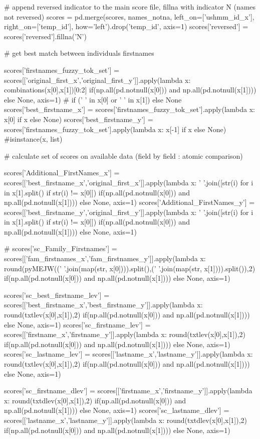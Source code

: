 \documentclass[a4paper,12pt,twoside]{book}
\begin{document}
\begin{python}
  # append reversed indicator to the main score file, fillna with indicator N (names not reversed)
  scores = pd.merge(scores, names_notna, left_on=['ushmm_id_x'], right_on=['temp_id'], how='left').drop('temp_id', axis=1)
  scores['reversed'] = scores['reversed'].fillna('N')
   
  # get best match between individuals firstnames

  scores['firstnames_fuzzy_tok_set'] = scores[['original_first_x','original_first_y']].apply(lambda x: combinations(x[0],x[1])[0:2] if(np.all(pd.notnull(x[0])) and np.all(pd.notnull(x[1]))) else None, axis=1) # if (' ' in x[0] or ' ' in x[1]) else None
  scores['best_firstname_x'] = scores['firstnames_fuzzy_tok_set'].apply(lambda x: x[0] if x else None)
  scores['best_firstname_y'] = scores['firstnames_fuzzy_tok_set'].apply(lambda x: x[-1] if x else None) #isinstance(x, list)
  
  # calculate set of scores on available data (field by field : atomic comparison)

  scores['Additional_FirstNames_x'] = scores[['best_firstname_x','original_first_x']].apply(lambda x: ' '.join([str(i) for i in x[1].split() if str(i) != x[0]]) if(np.all(pd.notnull(x[0])) and np.all(pd.notnull(x[1]))) else None, axis=1)
  scores['Additional_FirstNames_y'] = scores[['best_firstname_y','original_first_y']].apply(lambda x: ' '.join([str(i) for i in x[1].split() if str(i) != x[0]]) if(np.all(pd.notnull(x[0])) and np.all(pd.notnull(x[1]))) else None, axis=1)

  # scores['sc_Family_Firstnames'] = scores[['fam_firstnames_x','fam_firstnames_y']].apply(lambda x: round(pyMEJW((' '.join(map(str, x[0]))).split(),(' '.join(map(str, x[1]))).split()),2) if(np.all(pd.notnull(x[0])) and np.all(pd.notnull(x[1]))) else None, axis=1)

  scores['sc_best_firstname_lev'] = scores[['best_firstname_x','best_firstname_y']].apply(lambda x: round(txtlev(x[0],x[1]),2) if(np.all(pd.notnull(x[0])) and np.all(pd.notnull(x[1]))) else None, axis=1)
  scores['sc_firstname_lev'] = scores[['firstname_x','firstname_y']].apply(lambda x: round(txtlev(x[0],x[1]),2) if(np.all(pd.notnull(x[0])) and np.all(pd.notnull(x[1]))) else None, axis=1)
  scores['sc_lastname_lev'] = scores[['lastname_x','lastname_y']].apply(lambda x: round(txtlev(x[0],x[1]),2) if(np.all(pd.notnull(x[0])) and np.all(pd.notnull(x[1]))) else None, axis=1)

  scores['sc_firstname_dlev'] = scores[['firstname_x','firstname_y']].apply(lambda x: round(txtdlev(x[0],x[1]),2) if(np.all(pd.notnull(x[0])) and np.all(pd.notnull(x[1]))) else None, axis=1)
  scores['sc_lastname_dlev'] = scores[['lastname_x','lastname_y']].apply(lambda x: round(txtdlev(x[0],x[1]),2) if(np.all(pd.notnull(x[0])) and np.all(pd.notnull(x[1]))) else None, axis=1)


\end{python}
\end{document}
